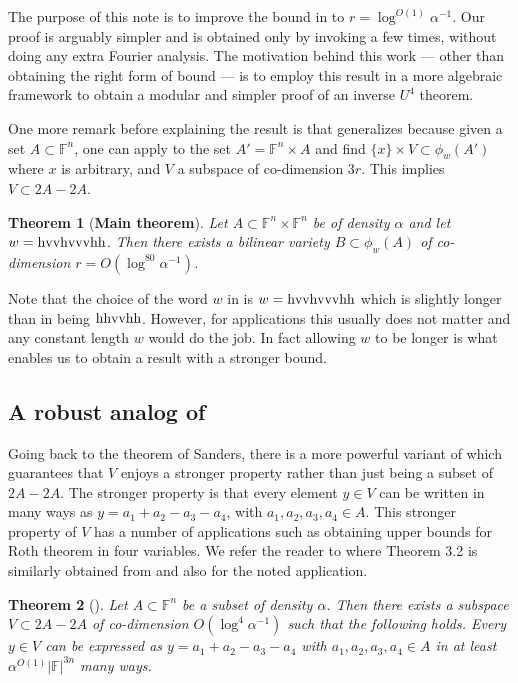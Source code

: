 \documentclass[12pt]{article}
\newcommand{\F}{\mathbb{F}}
\newcommand{\hr}{\textup{h}}
\newcommand{\vr}{\textup{v}}
\newtheorem{theorem}{Theorem}[section]
\begin{document}
The purpose of this note is to improve the bound in  to $r=  \log^{O(1)} \alpha^{-1}$. Our proof is arguably simpler and is obtained only by invoking  a few times, without doing any extra Fourier analysis. The motivation behind this work --- other than obtaining the right form of bound --- is to employ this result in a more algebraic framework to obtain a modular and simpler proof of an inverse $U^4$ theorem.

One more remark before explaining the result is that  generalizes  because given a set $A\subset\F^n$, one can apply  to the set $A' = \F^n\times A$ and find $\{x\}\times V \subset \phi_w(A')$ where $x$ is arbitrary, and $V$ a subspace of co-dimension $3r$. This implies $V\subset 2A-2A$.

\begin{theorem}[\textbf{Main theorem}]\label{theorem:main}
Let $A \subset \F^n \times \F^n$ be of density $\alpha$ and let $w = \hr\vr\vr\hr\vr\vr\vr\hr\hr$. Then there exists a bilinear variety $B \subset \phi_w(A)$
of co-dimension $r=O(\log^{80}\alpha^{-1})$.
\end{theorem}
Note that the choice of the word $w$ in  is $w = \hr\vr\vr\hr\vr\vr\vr\hr\hr$ which is slightly longer than in  being $\hr\hr\vr\vr\hr\hr$. However, for applications this usually does not matter and any constant length $w$ would do the job. In fact allowing $w$ to be longer is what enables us to obtain a result with a stronger bound.

\subsection{A robust analog of }
Going back to the theorem of Sanders, there is a more powerful variant of  which guarantees that $V$ enjoys a stronger property rather than just being a subset of $2A-2A$. The stronger property is that every element $y\in V$ can be written in many ways as $y = a_1+a_2-a_3-a_4$, with  $a_1,a_2,a_3,a_4 \in A$. This stronger property of $V$ has a number of applications such as obtaining upper bounds for Roth theorem in four variables. We refer the reader to \cite{schoen2016roth} where Theorem 3.2 is similarly obtained from  and also for the noted application.

\begin{theorem}[\cite{sanders2012bogolyubov,schoen2016roth}]
\label{theorem:statsanders}
Let $A \subset \F^n $ be a subset of density $\alpha$. Then there exists a subspace $V\subset 2A-2A$ of co-dimension $O(\log^4 \alpha^{-1})$ such that the following holds. Every $y \in V$ can be expressed as $y=a_1+a_2-a_3-a_4$ with $a_1,a_2,a_3,a_4 \in A$ in at
least $\alpha^{O(1)} |\F|^{3n}$ many ways.
\end{theorem}
\end{document}
